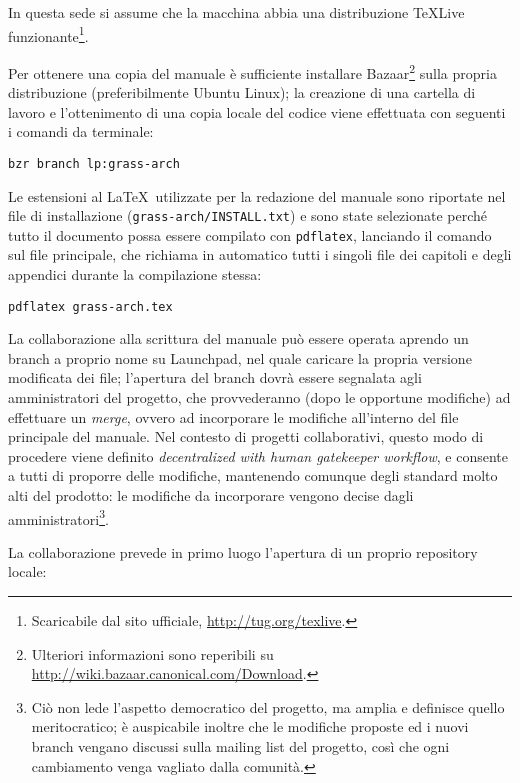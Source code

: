 \documentclass{article}
\begin{document}
\begin{multicols}{2}
In questa sede si assume che la macchina abbia una distribuzione \TeX Live funzionante\footnote{Scaricabile dal sito ufficiale, \url{http://tug.org/texlive}.}.

Per ottenere una copia del manuale è sufficiente installare Bazaar\footnote{Ulteriori informazioni sono reperibili su \url{http://wiki.bazaar.canonical.com/Download}.} sulla propria distribuzione (preferibilmente Ubuntu Linux); la creazione di una cartella di lavoro e l'ottenimento di una copia locale del codice viene effettuata con seguenti i comandi da terminale:

\begin{lstlisting}
bzr branch lp:grass-arch
\end{lstlisting}

Le estensioni al \LaTeX~utilizzate per la redazione del manuale sono riportate nel file di installazione (\verb|grass-arch/INSTALL.txt|) e sono state selezionate perché tutto il documento possa essere compilato con \texttt{pdflatex}, lanciando il comando sul file principale, che richiama in automatico tutti i singoli file dei capitoli e degli appendici durante la compilazione stessa:

\begin{lstlisting}
pdflatex grass-arch.tex
\end{lstlisting}

La collaborazione alla scrittura del manuale può essere operata aprendo un branch a proprio nome su Launchpad, nel quale caricare la propria versione modificata dei file; l'apertura del branch dovrà essere segnalata agli amministratori del progetto, che provvederanno (dopo le opportune modifiche) ad effettuare un \emph{merge}, ovvero ad incorporare le modifiche all'interno del file principale del manuale. Nel contesto di progetti collaborativi, questo modo di procedere viene definito \emph{decentralized with human gatekeeper workflow}, e consente a tutti di proporre delle modifiche, mantenendo comunque degli standard molto alti del prodotto: le modifiche da incorporare vengono decise dagli amministratori\footnote{Ciò non lede l'aspetto democratico del progetto, ma amplia e definisce quello meritocratico; è auspicabile inoltre che le modifiche proposte ed i nuovi branch vengano discussi sulla mailing list del progetto, cos\`{i} che ogni cambiamento venga vagliato dalla comunità.}.

La collaborazione prevede in primo luogo l'apertura di un proprio repository locale:


\end{multicols}
\end{document}
